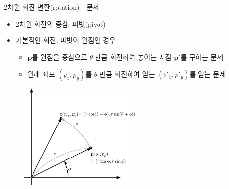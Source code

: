 \documentclass{beamer}
\begin{document}
\begin{frame}{2차원 회전 변환(rotation) - 문제}

{\small
\begin{itemize}
\item 2차원 회전의 중심: 피벗(pivot)
\item 기본적인 회전: 피벗이 원점인 경우
	\begin{itemize}
	\item $\mathbf p$를 원점을 중심으로 $\theta$ 만큼 회전하여 놓이는 지점 $\mathbf p'$를 구하는 문제
	\item 원래 좌표 $(p_x,p_y)$를 $\theta$ 만큼 회전하여 얻는 $(p'_x, p'_y)$를 얻는 문제
	\end{itemize}
\end{itemize}

\begin{figure}
    \includegraphics[width=6cm]{Math_transform/rotation.eps}
\end{figure}


}

\end{frame}
\end{document}
